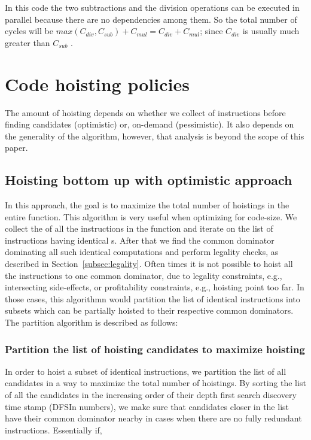 \documentclass{sig-alternate}
\begin{document}
In this code the two subtractions and the division operations can be executed in
parallel because there are no dependencies among them. So the total number of
cycles will be $max(C_{div}, C_{sub}) + C_{mul} = C_{div} + C_{mul}$; since $C_{div}$ is
usually much greater than $C_{sub}$ \cite{x86,aarch64}.


\newpage

\section{Code hoisting policies}
The amount of hoisting depends on whether we collect \GVN{} of instructions
before finding candidates (optimistic) or, on-demand (pessimistic). It also
depends on the generality of the \GVN{} algorithm, however, that analysis is beyond
the scope of this paper.

\subsection{Hoisting bottom up with optimistic approach}
\label{subsec:optimistic}
In this approach, the goal is to maximize the total number of hoistings in the
entire function.  This algorithm is very useful when optimizing for code-size.
We collect the \GVN{} of all the instructions in the function and iterate on the
list of instructions having identical \GVN{}s. After that we find the common
dominator dominating all such identical computations and perform legality
checks, as described in Section~\ref{subsec:legality}. Often times it is not
possible to hoist all the instructions to one common dominator, due to legality
constraints, e.g., intersecting side-effects, or profitability constraints, e.g.,
hoisting point too far. In those cases, this algorithmn would partition the list
of identical instructions into subsets which can be partially hoisted to their
respective common dominators. The partition algorithm is described as follows:

\subsubsection{Partition the list of hoisting candidates to maximize hoisting}
\label{subsec:partition}
In order to hoist a subset of identical instructions, we partition the list of
all candidates in a way to maximize the total number of hoistings.  By sorting
the list of all the candidates in the increasing order of their depth first
search discovery time stamp \cite{clrs} (DFSIn numbers), we make sure that
candidates closer in the list have their common dominator nearby in cases when
there are no fully redundant instructions. Essentially if,
\end{document}

